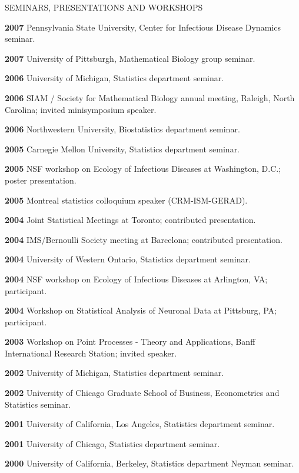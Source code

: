 \begin{mylist}{SEMINARS, PRESENTATIONS AND WORKSHOPS}
\item{\bf 2007 } Pennsylvania State University, Center for Infectious Disease Dynamics seminar.

\item{\bf 2007 } University of Pittsburgh, Mathematical Biology group seminar.

\item{\bf 2006 }  University of Michigan,
  Statistics department seminar. 
\item{\bf 2006 }  SIAM / Society for Mathematical Biology annual meeting, Raleigh, North Carolina; invited minisymposium speaker.
\item{\bf 2006 }  Northwestern University, 
 Biostatistics department seminar.
\item{\bf 2005 }  Carnegie Mellon University, 
 Statistics department seminar.
\item{\bf 2005 }  NSF workshop on Ecology of
  Infectious Diseases at Washington, D.C.; poster presentation.
\item{\bf 2005 } Montreal statistics
  colloquium speaker (CRM-ISM-GERAD).
\item{\bf 2004 } Joint Statistical Meetings at
  Toronto; contributed presentation.
\item{\bf 2004 } IMS/Bernoulli Society meeting at Barcelona; contributed presentation.
\item{\bf 2004 } University of Western Ontario, 
 Statistics department seminar.
\item{\bf 2004 } NSF workshop on Ecology of
  Infectious Diseases at Arlington, VA; participant.
\item{\bf 2004 } Workshop on Statistical Analysis of
  Neuronal Data at Pittsburg, PA; participant.
\item{\bf 2003 }  Workshop on Point Processes - Theory and Applications,
  Banff International Research Station; invited speaker.
\item{\bf 2002 }  University of Michigan,
  Statistics department seminar. 
\item{\bf 2002 }  University of Chicago Graduate School of Business, Econometrics and Statistics seminar. 
\item{\bf 2001 } University of California, Los Angeles, Statistics department seminar. 
\item{\bf 2001 }  University of Chicago, Statistics department seminar.  
\item{\bf 2000 } University of California, Berkeley, Statistics department Neyman seminar.
\end{mylist}














